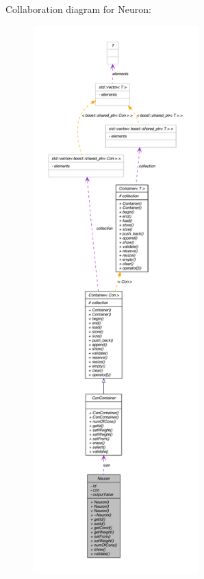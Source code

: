 Collaboration diagram for Neuron:\nopagebreak
\begin{figure}[H]
\begin{center}
\leavevmode
\includegraphics[height=600pt]{class_neuron__coll__graph}
\end{center}
\end{figure}
